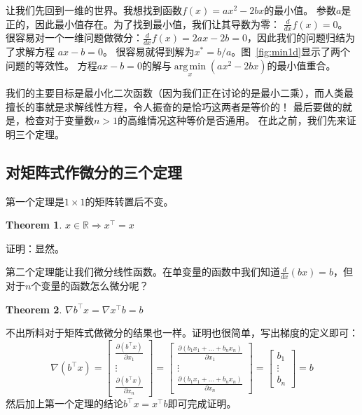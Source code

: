 \documentclass[notitlepage,oneside]{book}
\DeclareMathOperator*{\argmin}{arg\,min}
\newtheorem{theorem}{Theorem}
\begin{document}
让我们先回到一维的世界。我想找到函数$f(x) = ax^2 - 2bx$的最小值。
参数$a$是正的，因此最小值存在。为了找到最小值，我们让其导数为零： $\frac{d}{dx}f(x) = 0$。
很容易对一个一维问题做微分：$\frac{d}{dx}f(x) = 2ax - 2b = 0$，因此我们的问题归结为了求解方程 $ax-b=0$。
很容易就得到解为$x^* = b/a$。图~\ref{fig:min1d}显示了两个问题的等效性。
方程$ax-b=0$的解与$\argmin\limits_x(ax^2 - 2bx)$的最小值重合。

我们的主要目标是最小化二次函数（因为我们正在讨论的是最小二乘），而人类最擅长的事就是求解线性方程，令人振奋的是恰巧这两者是等价的！
最后要做的就是，检查对于变量数$n>1$的高维情况这种等价是否通用。
在此之前，我们先来证明三个定理。


\subsection{对矩阵式作微分的三个定理}
第一个定理是$1\times 1$的矩阵转置后不变。

\begin{theorem}
$x\in \mathbb R \Rightarrow x^\top = x$
\end{theorem}
证明：显然。

第二个定理能让我们微分线性函数。在单变量的函数中我们知道$\frac{d}{dx}(bx) = b$，但对于$n$个变量的函数怎么微分呢？
\begin{theorem}
$\nabla b^\top x = \nabla x^\top b = b$
\end{theorem}

不出所料对于矩阵式做微分的结果也一样。证明也很简单，写出梯度的定义即可：
$$\nabla(b^\top x) = \begin{bmatrix}\frac{\partial (b^\top x)}{\partial x_1} \\ \vdots \\ \frac{\partial (b^\top x)}{\partial x_n} \end{bmatrix} = \begin{bmatrix}\frac{\partial (b_1 x_1 + \dots + b_n x_n)}{\partial x_1} \\ \vdots \\ \frac{\partial (b_1 x_1 + \dots + b_n x_n)}{\partial x_n} \end{bmatrix}
= \begin{bmatrix}b_1 \\ \vdots \\ b_n \end{bmatrix} = b$$
然后加上第一个定理的结论$b^\top x = x^\top b$即可完成证明。
\end{document}

